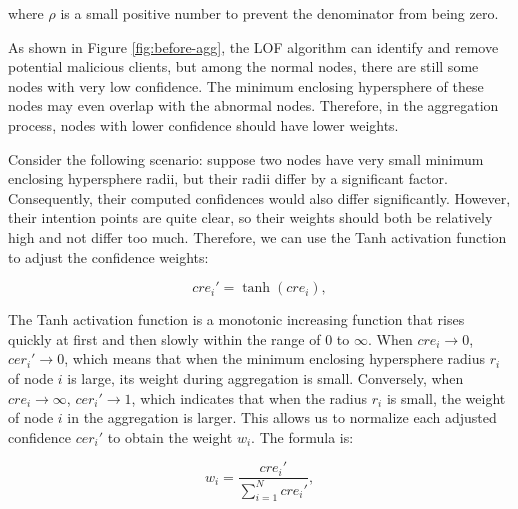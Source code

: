 \documentclass[lettersize,journal]{IEEEtran}
\begin{document}

where $\rho$ is a small positive number to prevent the denominator from being zero.

As shown in Figure \ref{fig:before-agg}, the LOF algorithm can identify and remove potential malicious clients, but among the normal nodes, there are still some nodes with very low confidence. The minimum enclosing hypersphere of these nodes may even overlap with the abnormal nodes. Therefore, in the aggregation process, nodes with lower confidence should have lower weights.

Consider the following scenario: suppose two nodes have very small minimum enclosing hypersphere radii, but their radii differ by a significant factor. Consequently, their computed confidences would also differ significantly. However, their intention points are quite clear, so their weights should both be relatively high and not differ too much. Therefore, we can use the Tanh activation function to adjust the confidence weights:

\begin{equation}
    cre_i'=\tanh(cre_i),
\end{equation}

The Tanh activation function is a monotonic increasing function that rises quickly at first and then slowly within the range of $0$ to $\infty$. When $cre_i \to 0$, $cer_i' \to 0$, which means that when the minimum enclosing hypersphere radius $r_i$ of node $i$ is large, its weight during aggregation is small. Conversely, when $cre_i \to \infty$, $cer_i' \to 1$, which indicates that when the radius $r_i$ is small, the weight of node $i$ in the aggregation is larger. This allows us to normalize each adjusted confidence $cer_i'$ to obtain the weight $w_i$. The formula is:

\begin{equation}
    w_i=\frac{cre_i'}{\sum_{i=1}^{N}cre_i'},
\end{equation}
\end{document}
